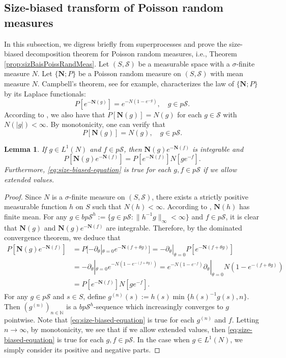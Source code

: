 \documentclass[UTF8]{pkuthss}
\theoremstyle{plain}
\newtheorem{lem}[thm]{Lemma}
\theoremstyle{definition}
\numberwithin{equation}{section}
\begin{document}
\subsection{Size-biased transform of Poisson random measures}
	In this subsection, we digress briefly from superprocesses and
   prove the size-biased decomposition theorem for Poisson random measures,
	i.e., Theorem \ref{prop:sizBaisPoissRandMeas}.
	Let $(S, \mathscr S)$ be a measurable space with a $\sigma$-finite measure $N$.
Let $\{\mathbf N; P\}$ be a Poisson random measure on $(S, \mathscr S)$ with mean measure $N$.
	Campbell's theorem, see \cite[Proof of Theorem 2.7]{Kyprianou2014Fluctuations} for example,
characterizes the law of $\{ \mathbf N; P \}$ by its Laplace functionals:
\[
	P [e^{-\mathbf N(g)}]
	= e^{-N(1 - e^{-g})},
	\quad g\in p\mathscr S.
\]
	According to \cite[Theorem 2.7]{Kyprianou2014Fluctuations}, we also have that $P [\mathbf N(g)] = N(g)$ for each $g\in \mathscr S$ with $N(|g|) < \infty.$
	By monotonicity, one can verify that
\[
	P [\mathbf N(g)] = N(g),
	\quad g\in p\mathscr S.
\]
\begin{lem}\label{lem:size-biased-lemma}
	If $g\in L^1(N)$ and $ f\in p\mathscr S$, then $\mathbf N(g) e^{-\mathbf N(f)}$ is integrable and
\begin{equation}\label{eq:size-biased-equation}
	P[\mathbf N(g) e^{-\mathbf N(f)}]
	= P[e^{-\mathbf N(f)}] N[g e^{-f}].
\end{equation}
	Furthermore, \eqref{eq:size-biased-equation} is true for each $g,f\in p\mathscr S$ if we allow extended values.	
\end{lem}
\begin{proof}
	Since $N$ is a $\sigma$-finite measure on $(S, \mathscr S)$, there exists a strictly positive measurable function $h$ on $S$ such that $N(h)<\infty$.
	According to \cite[Theorem 2.7.]{Kyprianou2014Fluctuations}, $\mathbf N(h)$ has finite mean.
	For any $g\in bp\mathscr S^h :=\{g\in p\mathscr S: \|h^{-1}g\|_\infty <\infty\}$ and $f\in p\mathscr S$, it is clear that $\mathbf N(g)$ and $\mathbf N(g)e^{-\mathbf N(f)}$ are integrable.
	Therefore, by the dominated convergence theorem, we deduce that
\begin{align}
	P[\mathbf N(g) e^{-\mathbf N(f)}]
	&=P[-\partial_\theta|_{\theta=0} e^{-\mathbf N(f+\theta g)}]
	= -\partial_\theta|_{\theta=0} P[e^{-\mathbf N(f+\theta g)}]\\
	&= -\partial_\theta|_{\theta=0} e^{-N(1-e^{-(f+\theta g)})}
	= e^{- N(1-e^{-f})} \partial_\theta|_{\theta=0}N(1-e^{-(f+\theta g)})\\
	&= P[e^{-\mathbf N(f)}]N[ge^{-f}].
\end{align}
	For any $g\in p\mathscr S$ and $s\in S$, define $g^{(n)}(s) := h(s) \min\{h(s)^{-1}g(s),n\}$.
	Then $(g^{(n)})_{n\in \mathbb N}$ is a $bp\mathscr S^h$-sequence which increasingly
	converges to $g$ pointwise.
	Note that \eqref{eq:size-biased-equation} is true for each $g^{(n)}$ and $f$.
	Letting $n\to\infty$, by monotonicity, we see that if we allow extended values, then \eqref{eq:size-biased-equation} is true for each $g,f\in p\mathscr S$.
	In the case when $g\in L^1(N)$, we simply consider its positive and negative parts.
\end{proof}
\end{document}
